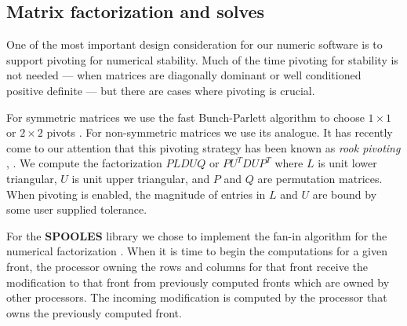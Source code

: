 \subsection{Matrix factorization and solves}
\label{subsection:intro:solve}
\par
One of the most important design consideration for our numeric
software is to support pivoting for numerical stability.
Much of the time pivoting for stability is not needed --- 
when matrices are diagonally dominant or well conditioned positive definite --- 
but there are
cases where pivoting is crucial.
\par
For symmetric matrices we use the fast Bunch-Parlett algorithm
to choose $1 \times 1$ or $2 \times 2$ pivots
\cite{ash95-AGL}.
For non-symmetric matrices we use its analogue.
It has recently come to our attention that this
pivoting strategy has been known as {\it rook pivoting}
\cite{fo96-rook}, \cite{ne92-rook}.
We compute the factorization
$P L D U Q$ or $P U^T D U P^T$
where $L$ is unit lower triangular,
$U$ is unit upper triangular,
and $P$ and $Q$ are permutation matrices.
When pivoting is enabled, the magnitude of entries in $L$ and
$U$ are bound by some user supplied tolerance.
\par
For the {\bf SPOOLES} library we chose to implement the fan-in 
algorithm for the numerical factorization
\cite{ash90-fan-in}.  When it is time
to begin the computations for a given front, the processor owning
the rows and columns for that front receive the modification to 
that front from previously computed fronts which are owned by other
processors.  The incoming modification is computed by the processor
that owns the previously computed front.

